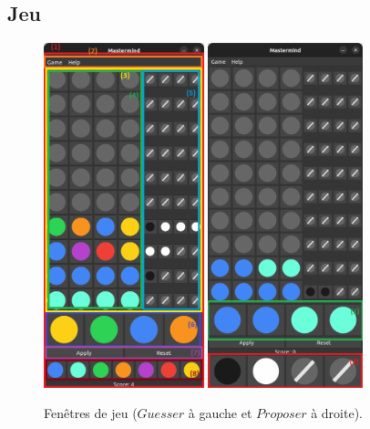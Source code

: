 \newpage
\subsection{Jeu}

\begin{figure}[htbp]
    \centering
    \includegraphics[width=0.414\textwidth]{game_guesser.png}
    \includegraphics[width=0.4\textwidth]{game_proposer.png}
    \caption{Fenêtres de jeu ($Guesser$ à gauche et $Proposer$ à droite).}
\end{figure}

